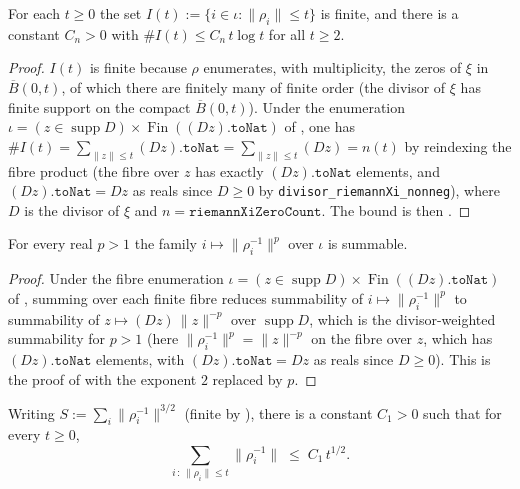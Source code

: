 \begin{lemma}
\label{lem:cm_card}
\leanok
{}
For each $t\ge0$ the set $I(t):=\{i\in\iota:\|\rho_i\|\le t\}$ is finite, and there is a
constant $C_n>0$ with $\#I(t)\le C_n\,t\log t$ for all $t\ge2$.
\end{lemma}

\begin{proof}
\leanok
{}
$I(t)$ is finite because $\rho$ enumerates, with multiplicity, the zeros of $\xi$ in
$\overline B(0,t)$, of which there are finitely many of finite order (the divisor of $\xi$
has finite support on the compact $\overline B(0,t)$). Under the enumeration
$\iota=(z\in\operatorname{supp}D)\times\operatorname{Fin}((Dz).\mathtt{toNat})$ of
, one has $\#I(t)=\sum_{\|z\|\le t}(Dz).\mathtt{toNat}
=\sum_{\|z\|\le t}(Dz)=n(t)$ by reindexing the fibre product (the fibre over $z$ has exactly
$(Dz).\mathtt{toNat}$ elements, and $(Dz).\mathtt{toNat}=Dz$ as reals since $D\ge0$ by
\texttt{divisor\_riemannXi\_nonneg}), where $D$ is the divisor of $\xi$ and
$n=\texttt{riemannXiZeroCount}$. The bound is then .
\end{proof}

\begin{lemma}
\label{lem:cm_summable_rpow}
\leanok
{}
For every real $p>1$ the family $i\mapsto\|\rho_i^{-1}\|^{p}$ over $\iota$ is summable.
\end{lemma}

\begin{proof}
\leanok
{}
Under the fibre enumeration
$\iota=(z\in\operatorname{supp}D)\times\operatorname{Fin}((Dz).\mathtt{toNat})$ of
, summing over each finite fibre reduces summability of
$i\mapsto\|\rho_i^{-1}\|^{p}$ to summability of $z\mapsto(Dz)\,\|z\|^{-p}$ over
$\operatorname{supp}D$, which is the divisor-weighted summability 
for $p>1$ (here $\|\rho_i^{-1}\|^{p}=\|z\|^{-p}$ on the fibre over $z$, which has $(Dz).\mathtt{toNat}$
elements, with $(Dz).\mathtt{toNat}=Dz$ as reals since $D\ge0$). This is the proof of
 with the exponent $2$ replaced by $p$.
\end{proof}

\begin{lemma}
\label{lem:cm_sum_inv}
\leanok
{}
Writing $S:=\sum_i\|\rho_i^{-1}\|^{3/2}$ (finite by ), there is a
constant $C_1>0$ such that for every $t\ge0$,
\[
  \sum_{i\,:\,\|\rho_i\|\le t}\|\rho_i^{-1}\|\;\le\;C_1\,t^{1/2}.
\]
\end{lemma}


